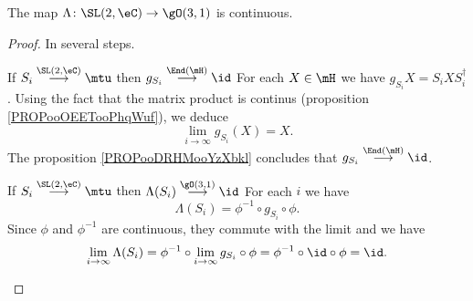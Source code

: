 \begin{lemma}       \label{LEMooTLQKooGntuRH}
    The map \( \Lambda\colon \SL(2,\eC)\to \gO(3,1)\) is continuous.
\end{lemma}

\begin{proof}
    In several steps.
    \begin{subproof}
        \item[If $ S_i\stackrel{\SL(2,\eC)}{\longrightarrow}\mtu$ then $g_{S_i}\stackrel{\End(\mH)}{\longrightarrow}\id$]
            For each \( X\in \mH\) we have \( g_{S_i}X=S_iXS_i^{\dag}\). Using the fact that the matrix product is continus (proposition \ref{PROPooOEETooPhqWuf}), we deduce
            \begin{equation}
                \lim_{i\to \infty} g_{S_i}(X)=X.
            \end{equation}
            The proposition \ref{PROPooDRHMooYzXbkl} concludes that \( g_{S_i}\stackrel{\End(\mH)}{\longrightarrow}\id\).
        \item[If $ S_i\stackrel{\SL(2,\eC)}{\longrightarrow}\mtu$ then $ \Lambda(S_i)\stackrel{\gO(3,1)}{\longrightarrow}\id$]
            For each \( i\) we have
            \begin{equation}
                \Lambda(S_i)=\phi^{-1}\circ g_{S_i}\circ \phi.
            \end{equation}
            Since \( \phi\) and \( \phi^{-1}\) are continuous, they commute with the limit and we have
            \begin{equation}
                \lim_{i\to \infty} \Lambda(S_i)=\phi^{-1}\circ\lim_{i\to \infty} g_{S_i}\circ\phi=\phi^{-1}\circ\id\circ \phi=\id.
            \end{equation}


\end{subproof}
\end{proof}
